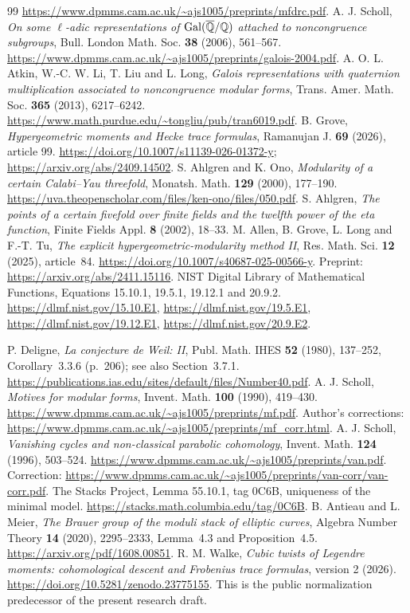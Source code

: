 \begin{thebibliography}{99}
\url{https://www.dpmms.cam.ac.uk/~ajs1005/preprints/mfdrc.pdf}.
 A. J. Scholl,
\emph{On some $\ell$-adic representations of
$\operatorname{Gal}(\overline{\mathbb Q}/\mathbb Q)$ attached to noncongruence subgroups},
Bull. London Math. Soc. \textbf{38} (2006), 561--567.
\url{https://www.dpmms.cam.ac.uk/~ajs1005/preprints/galois-2004.pdf}.
 A. O. L. Atkin, W.-C. W. Li, T. Liu and L. Long,
\emph{Galois representations with quaternion multiplication associated
to noncongruence modular forms}, Trans. Amer. Math. Soc.
\textbf{365} (2013), 6217--6242.
\url{https://www.math.purdue.edu/~tongliu/pub/tran6019.pdf}.
 B. Grove, \emph{Hypergeometric moments and Hecke trace formulas},
Ramanujan J. \textbf{69} (2026), article 99.
\url{https://doi.org/10.1007/s11139-026-01372-y};
\url{https://arxiv.org/abs/2409.14502}.
 S. Ahlgren and K. Ono,
\emph{Modularity of a certain Calabi--Yau threefold},
Monatsh. Math. \textbf{129} (2000), 177--190.
\url{https://uva.theopenscholar.com/files/ken-ono/files/050.pdf}.
 S. Ahlgren,
\emph{The points of a certain fivefold over finite fields and the twelfth
power of the eta function}, Finite Fields Appl. \textbf{8} (2002), 18--33.
 M. Allen, B. Grove, L. Long and F.-T. Tu,
\emph{The explicit hypergeometric-modularity method II},
Res. Math. Sci. \textbf{12} (2025), article~84.
\url{https://doi.org/10.1007/s40687-025-00566-y}.
Preprint: \url{https://arxiv.org/abs/2411.15116}.
 NIST Digital Library of Mathematical Functions,
Equations 15.10.1, 19.5.1, 19.12.1 and 20.9.2.
\url{https://dlmf.nist.gov/15.10.E1},
\url{https://dlmf.nist.gov/19.5.E1},
\url{https://dlmf.nist.gov/19.12.E1},
\url{https://dlmf.nist.gov/20.9.E2}.

 P. Deligne, \emph{La conjecture de Weil: II},
Publ. Math. IHES \textbf{52} (1980), 137--252,
Corollary~3.3.6 (p.~206); see also Section~3.7.1.
\url{https://publications.ias.edu/sites/default/files/Number40.pdf}.
 A. J. Scholl, \emph{Motives for modular forms},
Invent. Math. \textbf{100} (1990), 419--430.
\url{https://www.dpmms.cam.ac.uk/~ajs1005/preprints/mf.pdf}.
Author's corrections: \url{https://www.dpmms.cam.ac.uk/~ajs1005/preprints/mf_corr.html}.
 A. J. Scholl,
\emph{Vanishing cycles and non-classical parabolic cohomology},
Invent. Math. \textbf{124} (1996), 503--524.
\url{https://www.dpmms.cam.ac.uk/~ajs1005/preprints/van.pdf}.
Correction: \url{https://www.dpmms.cam.ac.uk/~ajs1005/preprints/van-corr/van-corr.pdf}.
 The Stacks Project, Lemma 55.10.1, tag 0C6B,
uniqueness of the minimal model.
\url{https://stacks.math.columbia.edu/tag/0C6B}.
 B. Antieau and L. Meier,
\emph{The Brauer group of the moduli stack of elliptic curves},
Algebra Number Theory \textbf{14} (2020), 2295--2333,
Lemma~4.3 and Proposition~4.5.
\url{https://arxiv.org/pdf/1608.00851}.
 R. M. Walke, \emph{Cubic twists of Legendre moments:
cohomological descent and Frobenius trace formulas}, version 2 (2026).
\url{https://doi.org/10.5281/zenodo.23775155}.
This is the public normalization predecessor of the present research draft.


\end{thebibliography}
